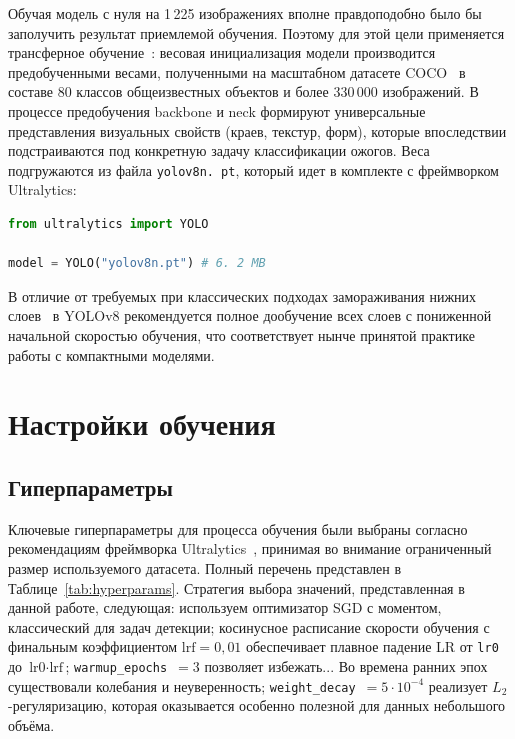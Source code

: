 Обучая модель с нуля на 1\,225 изображениях вполне правдоподобно было бы заполучить результат приемлемой обучения. Поэтому для этой цели применяется трансферное обучение~\cite{yosinski2014transfer}: весовая инициализация модели производится предобученными весами, полученными на масштабном датасете COCO~\cite{lin2014coco} в составе 80 классов общеизвестных объектов и более 330\,000 изображений. В процессе предобучения backbone и neck формируют универсальные представления визуальных свойств (краев, текстур, форм), которые впоследствии подстраиваются под конкретную задачу классификации ожогов. Веса подгружаются из файла \texttt{yolov8n. pt}, который идет в комплекте с фреймворком Ultralytics:

\begin{lstlisting}[language=Python, caption={Инициализация модели YOLOv8n с весами, предобученными на COCO}, label=lst:init]
from ultralytics import YOLO

model = YOLO("yolov8n.pt") # 6. 2 MB
\end{lstlisting}

В отличие от требуемых при классических подходах замораживания нижних слоев~\cite{yosinski2014transfer} в YOLOv8 рекомендуется полное дообучение всех слоев с пониженной начальной скоростью обучения, что соответствует нынче принятой практике работы с компактными моделями. \section{Настройки обучения}

\subsection{Гиперпараметры}

Ключевые гиперпараметры для процесса обучения были выбраны согласно рекомендациям фреймворка Ultralytics~\cite{ultralytics2023yolov8}, принимая во внимание ограниченный размер используемого датасета. Полный перечень представлен в Таблице~\ref{tab:hyperparams}. Стратегия выбора значений, представленная в данной работе, следующая: используем оптимизатор SGD с моментом, классический для задач детекции; косинусное расписание скорости обучения с финальным коэффициентом $\text{lrf}=0{,}01$ обеспечивает плавное падение LR от \texttt{lr0} до $\text{lr0} \cdot \text{lrf}$; \texttt{warmup\_epochs}~$=3$ позволяет избежать... Во времена ранних эпох существовали колебания и неуверенность; \texttt{weight\_decay}~$=5{\cdot}10^{-4}$ реализует $L_2$-регуляризацию, которая оказывается особенно полезной для данных небольшого объёма.

